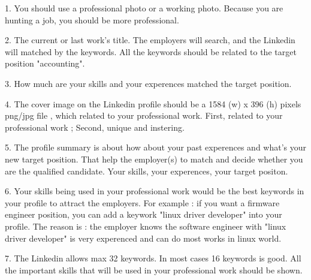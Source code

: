 1. You should use a professional photo or a working photo.
Because you are hunting a job, you should be more professional.

2. The current or last work's title.
The employers will search, and the Linkedin will matched by the keywords.
All the keywords should be related to the target position "accounting".

3.
How much are your skills and your experences matched the target position.

4.
The cover image on the Linkedin profile should be a 1584 (w) x 396 (h) pixels png/jpg file ,
which related to your professional work.
First, related to your professional work ; 
Second, unique and instering.

5.
The profile summary is about how about your past experences and what's your new target position.
That help the employer(s) to match and decide whether you are the qualified candidate.
Your skills, your experences, your target positon.

6.
Your skills being used in your professional work would be the best keywords in your profile to attract the employers.
For example : if you want a firmware engineer position, you can add a keywork "linux driver developer" into your profile.
The reason is : the employer knows the software engineer with "linux driver developer" is very experenced and can do most works in linux world.

7.
The Linkedin allows max 32 keywords.
In most cases 16 keywords is good.
All the important skills that will be used in your professional work should be shown.


\bye
